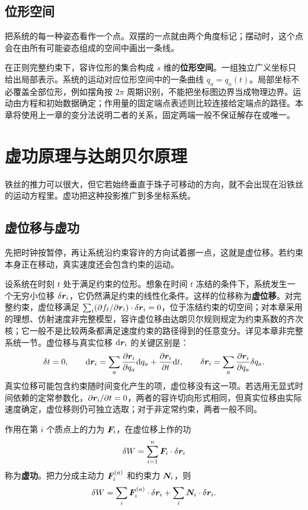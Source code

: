 \subsection{位形空间}

把系统的每一种姿态看作一个点。双摆的一点就由两个角度标记；摆动时，这个点会在由所有可能姿态组成的空间中画出一条线。

在正则完整约束下，容许位形的集合构成 $s$ 维的\textbf{位形空间}。一组独立广义坐标只给出局部表示。系统的运动对应位形空间中的一条曲线 $q_a=q_a(t)$。局部坐标不必覆盖全部位形，例如摆角按 $2\pi$ 周期识别，不能把坐标图边界当成物理边界。运动由方程和初始数据确定；作用量的固定端点表述则比较连接给定端点的路径。本章将使用上一章的变分法说明二者的关系，固定两端一般不保证解存在或唯一。

\section{虚功原理与达朗贝尔原理}

铁丝的推力可以很大，但它若始终垂直于珠子可移动的方向，就不会出现在沿铁丝的运动方程里。虚功把这种投影推广到多坐标系统。

\subsection{虚位移与虚功}

先把时钟按暂停，再让系统沿约束容许的方向试着挪一点，这就是虚位移。若约束本身正在移动，真实速度还会包含约束的运动。

设系统在时刻 $t$ 处于满足约束的位形。想象在时间 $t$ 冻结的条件下，系统发生一个无穷小位移 $\delta\boldsymbol{r}_i$，它仍然满足约束的线性化条件。这样的位移称为\textbf{虚位移}。对完整约束，虚位移满足 $\sum_i(\partial f_\ell/\partial\boldsymbol{r}_i)\cdot\delta\boldsymbol{r}_i=0$，位于冻结约束的切空间；对本章采用的理想、仿射速度非完整模型，容许虚位移由达朗贝尔规则规定为约束系数的齐次核；它一般不是比较两条都满足速度约束的路径得到的任意变分。详见本章非完整系统一节。虚位移与真实位移 $\mathrm{d}\boldsymbol{r}_i$ 的关键区别是：
\begin{equation}
\delta t=0,
\qquad
\mathrm{d}\boldsymbol{r}_i=\sum_a\frac{\partial \boldsymbol{r}_i}{\partial q_a}\mathrm{d} q_a+\frac{\partial \boldsymbol{r}_i}{\partial t}\mathrm{d} t,
\qquad
\delta\boldsymbol{r}_i=\sum_a\frac{\partial \boldsymbol{r}_i}{\partial q_a}\delta q_a.
\label{eq:virtual-vs-real}
\end{equation}
真实位移可能包含约束随时间变化产生的项，虚位移没有这一项。若选用无显式时间依赖的定常参数化，$\partial\boldsymbol{r}_i/\partial t=0$，两者的容许切向形式相同，但真实位移由实际速度确定，虚位移则仍可独立选取；对于非定常约束，两者一般不同。

作用在第 $i$ 个质点上的力为 $\boldsymbol{F}_i$，在虚位移上作的功
\[
\delta W=\sum_{i=1}^{n}\boldsymbol{F}_i\cdot\delta\boldsymbol{r}_i
\]
称为\textbf{虚功}。把力分成主动力 $\boldsymbol{F}_i^{(a)}$ 和约束力 $\boldsymbol{N}_i$，则
\[
\delta W=\sum_i\boldsymbol{F}_i^{(a)}\cdot\delta\boldsymbol{r}_i
+\sum_i\boldsymbol{N}_i\cdot\delta\boldsymbol{r}_i.
\]
